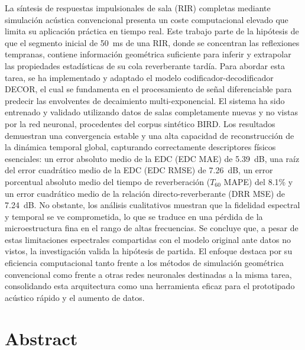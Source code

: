 La síntesis de respuestas impulsionales de sala (RIR) completas mediante simulación acústica convencional presenta un coste computacional elevado que limita su aplicación práctica en tiempo real. Este trabajo parte de la hipótesis de que el segmento inicial de 50~ms de una RIR, donde se concentran las  reflexiones tempranas, contiene información geométrica suficiente para inferir y extrapolar las propiedades estadísticas de su cola reverberante tardía. Para abordar esta tarea, se ha implementado y adaptado el modelo codificador-decodificador DECOR, el cual se fundamenta en el procesamiento de señal diferenciable para predecir las envolventes de decaimiento multi-exponencial. El sistema ha sido entrenado y validado utilizando datos de salas completamente nuevas y no vistas por la red neuronal, procedentes del corpus sintético BIRD. Los resultados demuestran una convergencia estable y una alta capacidad de reconstrucción de la dinámica temporal global, capturando correctamente descriptores físicos esenciales: un error absoluto medio de la EDC (EDC MAE) de 5.39~dB, una raíz del error cuadrático medio de la EDC (EDC RMSE) de 7.26~dB, un error porcentual absoluto medio del tiempo de reverberación ($T_{60}$ MAPE) del 8.1\% y un error cuadrático medio de la relación directo-reverberante (DRR MSE) de 7.24~dB. No obstante, los análisis cualitativos muestran que la fidelidad espectral y temporal se ve comprometida, lo que se traduce en una pérdida de la microestructura fina en el rango de altas frecuencias. Se concluye que, a pesar de estas limitaciones espectrales compartidas con el modelo original ante datos no vistos, la investigación valida la hipótesis de partida. El enfoque destaca por su eficiencia computacional tanto frente a los métodos de simulación geométrica convencional como frente a otras redes neuronales destinadas a la misma tarea, consolidando esta arquitectura como una herramienta eficaz para el prototipado acústico rápido y el aumento de datos.
\vfill %
\chapter*{Abstract}

